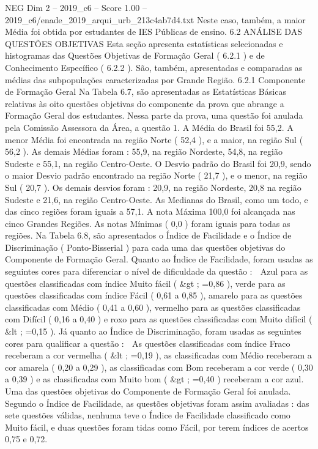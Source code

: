 \begin{textsample}{NEG Dim 2 – 2019\_c6 – Score 1.00 – 2019\_c6/enade\_2019\_arqui\_urb\_213c4ab7d4.txt}
Neste caso, também, a maior Média foi obtida por estudantes de IES Públicas de ensino. 6.2 ANÁLISE DAS QUESTÕES OBJETIVAS Esta seção apresenta estatísticas selecionadas e histogramas das Questões Objetivas de Formação Geral ( 6.2.1 ) e de Conhecimento Específico ( 6.2.2 ).
São, também, apresentadas e comparadas as médias das subpopulações caracterizadas por Grande Região. 6.2.1 Componente de Formação Geral Na Tabela 6.7, são apresentadas as Estatísticas Básicas relativas às oito questões objetivas do componente da prova que abrange a Formação Geral dos estudantes.
Nessa parte da prova, uma questão foi anulada pela Comissão Assessora da Área, a questão 1.
A Média do Brasil foi 55,2.
A menor Média foi encontrada na região Norte ( 52,4 ), e a maior, na região Sul ( 56,2 ).
As demais Médias foram : 55,9, na região Nordeste, 54,8, na região Sudeste e 55,1, na região Centro-Oeste.
O Desvio padrão do Brasil foi 20,9, sendo o maior Desvio padrão encontrado na região Norte ( 21,7 ), e o menor, na região Sul ( 20,7 ).
Os demais desvios foram : 20,9, na região Nordeste, 20,8 na região Sudeste e 21,6, na região Centro-Oeste.
As Medianas do Brasil, como um todo, e das cinco regiões foram iguais a 57,1.
A nota Máxima 100,0 foi alcançada nas cinco Grandes Regiões.
As notas Mínimas ( 0,0 ) foram iguais para todas as regiões.
Na Tabela 6.8, são apresentados o Índice de Facilidade e o Índice de Discriminação ( Ponto-Bisserial ) para cada uma das questões objetivas do Componente de Formação Geral.
Quanto ao Índice de Facilidade, foram usadas as seguintes cores para diferenciar o nível de dificuldade da questão :  Azul para as questões classificadas com índice Muito fácil ( \&gt ; =0,86 ), verde para as questões classificadas com índice Fácil ( 0,61 a 0,85 ), amarelo para as questões classificadas com Médio ( 0,41 a 0,60 ), vermelho para as questões classificadas com Difícil ( 0,16 a 0,40 ) e roxo para as questões classificadas com Muito difícil ( \&lt ; =0,15 ).
Já quanto ao Índice de Discriminação, foram usadas as seguintes cores para qualificar a questão :  As questões classificadas com índice Fraco receberam a cor vermelha ( \&lt ; =0,19 ), as classificadas com Médio receberam a cor amarela ( 0,20 a 0,29 ), as classificadas com Bom receberam a cor verde ( 0,30 a 0,39 ) e as classificadas com Muito bom ( \&gt ; =0,40 ) receberam a cor azul.
Uma das questões objetivas do Componente de Formação Geral foi anulada.
Segundo o Índice de Facilidade, as questões objetivas foram assim avaliadas : das sete questões válidas, nenhuma teve o Índice de Facilidade classificado como Muito fácil, e duas questões foram tidas como Fácil, por terem índices de acertos 0,75 e 0,72.

\end{textsample}

